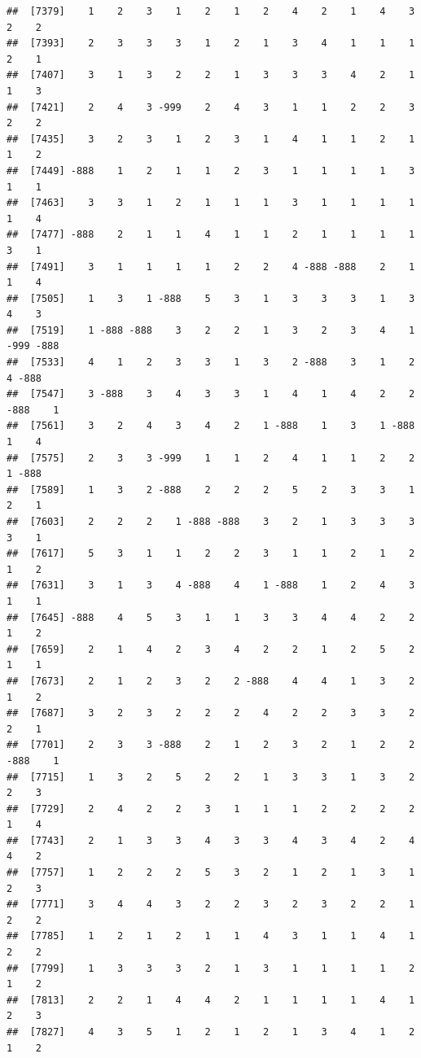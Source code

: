 \documentclass[
  12pt,
  openany]{book}
\begin{document}
\begin{verbatim}
##  [7379]    1    2    3    1    2    1    2    4    2    1    4    3    2    2
##  [7393]    2    3    3    3    1    2    1    3    4    1    1    1    2    1
##  [7407]    3    1    3    2    2    1    3    3    3    4    2    1    1    3
##  [7421]    2    4    3 -999    2    4    3    1    1    2    2    3    2    2
##  [7435]    3    2    3    1    2    3    1    4    1    1    2    1    1    2
##  [7449] -888    1    2    1    1    2    3    1    1    1    1    3    1    1
##  [7463]    3    3    1    2    1    1    1    3    1    1    1    1    1    4
##  [7477] -888    2    1    1    4    1    1    2    1    1    1    1    3    1
##  [7491]    3    1    1    1    1    2    2    4 -888 -888    2    1    1    4
##  [7505]    1    3    1 -888    5    3    1    3    3    3    1    3    4    3
##  [7519]    1 -888 -888    3    2    2    1    3    2    3    4    1 -999 -888
##  [7533]    4    1    2    3    3    1    3    2 -888    3    1    2    4 -888
##  [7547]    3 -888    3    4    3    3    1    4    1    4    2    2 -888    1
##  [7561]    3    2    4    3    4    2    1 -888    1    3    1 -888    1    4
##  [7575]    2    3    3 -999    1    1    2    4    1    1    2    2    1 -888
##  [7589]    1    3    2 -888    2    2    2    5    2    3    3    1    2    1
##  [7603]    2    2    2    1 -888 -888    3    2    1    3    3    3    3    1
##  [7617]    5    3    1    1    2    2    3    1    1    2    1    2    1    2
##  [7631]    3    1    3    4 -888    4    1 -888    1    2    4    3    1    1
##  [7645] -888    4    5    3    1    1    3    3    4    4    2    2    1    2
##  [7659]    2    1    4    2    3    4    2    2    1    2    5    2    1    1
##  [7673]    2    1    2    3    2    2 -888    4    4    1    3    2    1    2
##  [7687]    3    2    3    2    2    2    4    2    2    3    3    2    2    1
##  [7701]    2    3    3 -888    2    1    2    3    2    1    2    2 -888    1
##  [7715]    1    3    2    5    2    2    1    3    3    1    3    2    2    3
##  [7729]    2    4    2    2    3    1    1    1    2    2    2    2    1    4
##  [7743]    2    1    3    3    4    3    3    4    3    4    2    4    4    2
##  [7757]    1    2    2    2    5    3    2    1    2    1    3    1    2    3
##  [7771]    3    4    4    3    2    2    3    2    3    2    2    1    2    2
##  [7785]    1    2    1    2    1    1    4    3    1    1    4    1    2    2
##  [7799]    1    3    3    3    2    1    3    1    1    1    1    2    1    2
##  [7813]    2    2    1    4    4    2    1    1    1    1    4    1    2    3
##  [7827]    4    3    5    1    2    1    2    1    3    4    1    2    1    2

\end{verbatim}
\end{document}
